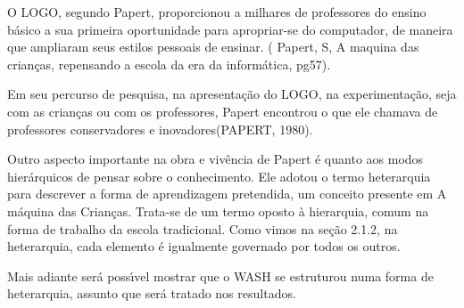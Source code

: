 \documentclass[
12pt,		%
openright,	%
twoside,  %
a4paper,			%
chapter=TITLE,		%
english,			%
french,				%
spanish,			%
brazil				%
]{USPSC-classe/USPSC}
\begin{document}
O LOGO, segundo Papert, proporcionou a milhares de professores do ensino b\'asico a sua primeira oportunidade para apropriar-se do computador, de maneira que ampliaram seus estilos pessoais de ensinar. ( Papert, S, \textquotedbl A maquina das crian\c{c}as, repensando a escola da era da inform\'atica\textquotedbl , pg57).

















Em seu percurso de pesquisa, na apresenta\c{c}\~ao do LOGO, na experimenta\c{c}\~ao, seja com as crian\c{c}as ou com os professores, Papert encontrou o que ele chamava de \textquotedbl professores conservadores e  inovadores\textquotedbl  (PAPERT, 1980).

















Outro aspecto importante na obra e viv\^encia de Papert \'e quanto aos modos hier\'arquicos de pensar sobre o conhecimento. Ele adotou o termo  \textquotedbl  heterarquia \textquotedbl  para descrever a forma de aprendizagem pretendida, um conceito presente em  \textquotedbl A m\'aquina das Crian\c{c}as\textquotedbl . Trata-se de  um termo oposto \`a hierarquia, comum na forma de trabalho da escola tradicional. Como vimos na se\c{c}\~ao 2.1.2, na heterarquia, cada elemento \'e igualmente governado por todos os outros.

















Mais adiante ser\'a poss\'{\i}vel mostrar que o WASH se estruturou numa forma de heterarquia, assunto que ser\'a tratado nos resultados.
\end{document}
